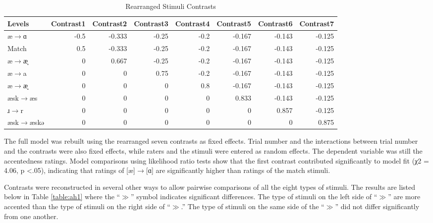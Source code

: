 \begin{table}[h!]
  \figSpace
  \centering
  \caption{Rearranged Stimuli Contrasts}
  \label{table:contr21}%
    \begin{tabular}{lrrrrrrr}
    \toprule
  Levels & Contrast1 & Contrast2 & Contrast3 & Contrast4 & Contrast5 & Contrast6 & Contrast7 \\
    \midrule
    æ$\rightarrow$ɑ    & -0.5  & -0.333 & -0.25 & -0.2  & -0.167 & -0.143 & -0.125 \\
    Match     & 0.5   & -0.333 & -0.25 & -0.2  & -0.167 & -0.143 & -0.125 \\
    æ$\rightarrow$æ̞& 0     & 0.667 & -0.25 & -0.2  & -0.167 & -0.143 & -0.125 \\
    æ$\rightarrow$a& 0     & 0     & 0.75  & -0.2  & -0.167 & -0.143 & -0.125 \\
    æ$\rightarrow$æ̝ & 0     & 0     & 0     & 0.8   & -0.167 & -0.143 & -0.125 \\
    æsk$\rightarrow$æs     & 0     & 0     & 0     & 0     & 0.833 & -0.143 & -0.125 \\
    ɹ$\rightarrow$r     & 0     & 0     & 0     & 0     & 0     & 0.857 & -0.125 \\
    æsk$\rightarrow$æskə    & 0     & 0     & 0     & 0     & 0     & 0     & 0.875 \\
    \bottomrule
    \end{tabular}%
      \figSpace
\end{table}%

The full model was rebuilt using the rearranged seven contrasts as fixed effects. Trial number and the interactions between trial number and the contrasts were also fixed effects, while raters and the stimuli were entered as random effects. The dependent variable was still the accentedness ratings. Model comparisons using likelihood ratio tests show that the first contrast contributed significantly to model fit (χ2 = 4.06, p <.05), indicating that ratings of [æ]$\rightarrow$[ɑ] are significantly higher than ratings of the match stimuli.

Contrasts were reconstructed in several other ways to allow pairwise comparisons of all the eight types of stimuli. The results are listed below in Table \ref{table:ah1} where the “$\gg$” symbol indicates significant differences. The type of stimuli on the left side of “$\gg$” are more accented than the type of stimuli on the right side of “$\gg$.” The type of stimuli on the same side of the “$\gg$” did not differ significantly from one another.

